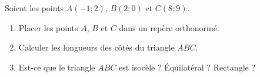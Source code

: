 
\begin{exercice}\label{exosmath-0508}


    Soient les points \( A(-1;2)\), \( B(2;0)\) et \( C(8;9)\).
    \begin{enumerate}
        \item
            Placer les points \( A\), \( B\) et \( C\) dans un repère orthonormé.
        \item
            Calculer les longueurs des côtés du triangle \( ABC\).
        \item
            Est-ce que le triangle \( ABC\) est isocèle ? Équilatéral ? Rectangle ?
    \end{enumerate}

\end{exercice}
